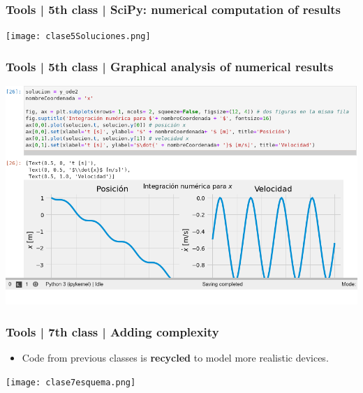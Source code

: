 \documentclass[aspectratio=169]{beamer}
\begin{document}
\begin{frame}
	\frametitle{Tools | 5th class | SciPy: numerical computation of results}
	\begin{block}{}
	\texttt{[image: clase5Soluciones.png]}
	\end{block}
\end{frame}


\begin{frame}
	\frametitle{Tools | 5th class | Graphical analysis of numerical results}
	\begin{block}{}
	\includegraphics[width= \textwidth]{clase5Representación}
	\end{block}
\end{frame}

\begin{frame}
	\frametitle{Tools | 7th class | Adding complexity}
	\begin{block}{}
		\begin{itemize}
			\item Code from previous classes is \textbf{recycled} to model more realistic devices.
		\end{itemize}
	\texttt{[image: clase7esquema.png]}
	\end{block}
\end{frame}
\end{document}
